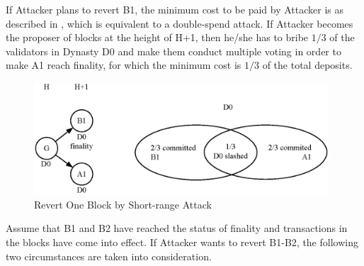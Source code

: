 
If Attacker plans to revert B1, the minimum cost to be paid by Attacker is as described in , which is equivalent to a double-spend attack. If Attacker becomes the proposer of blocks at the height of H+1, then he/she has to bribe $1/3$ of the validators in Dynasty D0 and make them conduct multiple voting in order to make A1 reach finality, for which the minimum cost is $1/3$ of the total deposits.


\begin{figure}[h]
\centering
\includegraphics[width=11cm]{./figs/revert1}
\caption{Revert One Block by Short-range Attack}
\label{fig:revert1}
\end{figure}

Assume that B1 and B2 have reached the status of finality and transactions in the blocks have come into effect. If Attacker wants to revert B1-B2, the following two circumstances are taken into consideration.

